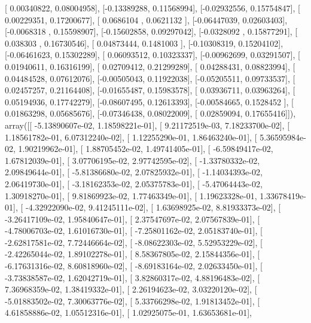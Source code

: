 \documentclass{article}
\begin{document}
       [ 0.00340822,  0.08004958],
       [-0.13389288,  0.11568994],
       [-0.02932556,  0.15754847],
       [ 0.00229351,  0.17200677],
       [ 0.0686104 ,  0.0621132 ],
       [-0.06447039,  0.02603403],
       [-0.0068318 ,  0.15598907],
       [-0.15602858,  0.09297042],
       [-0.0328092 ,  0.15877291],
       [ 0.038303  ,  0.16730546],
       [ 0.04873444,  0.1481003 ],
       [-0.10308319,  0.15204102],
       [-0.06461623,  0.15302289],
       [ 0.06093512,  0.10323337],
       [-0.00962699,  0.03291507],
       [ 0.01940611,  0.16316199],
       [ 0.02709412,  0.21299289],
       [ 0.04288431,  0.08823994],
       [ 0.04484528,  0.07612076],
       [-0.00505043,  0.11922038],
       [-0.05205511,  0.09733537],
       [ 0.02457257,  0.21164408],
       [-0.01655487,  0.15983578],
       [ 0.03936711,  0.03963264],
       [ 0.05194936,  0.17742279],
       [-0.08607495,  0.12613393],
       [-0.00584665,  0.1528452 ],
       [ 0.01863298,  0.05685676],
       [-0.07346438,  0.08022009],
       [ 0.02859094,  0.17655416]]), array([[ -5.13890607e-02,   1.18598221e-01],
       [  9.21172519e-03,   7.18233700e-02],
       [  1.18561782e-01,   6.07312240e-02],
       [  1.12255290e-01,   1.86463240e-01],
       [  5.36595984e-02,   1.90219962e-01],
       [  1.88705452e-02,   1.49741405e-01],
       [ -6.59849417e-02,   1.67812039e-01],
       [  3.07706195e-02,   2.97742595e-02],
       [ -1.33780332e-02,   2.09849644e-01],
       [ -5.81386680e-02,   2.07825932e-01],
       [ -1.14034393e-02,   2.06419730e-01],
       [ -3.18162353e-02,   2.05375783e-01],
       [ -5.47064443e-02,   1.30918270e-01],
       [  9.81869923e-02,   1.77463349e-01],
       [  1.19623328e-01,   1.33678419e-01],
       [ -4.32922090e-02,   9.41245111e-02],
       [  1.63698925e-02,   8.81933373e-02],
       [ -3.26417109e-02,   1.95840647e-01],
       [  2.37547697e-02,   2.07567839e-01],
       [ -4.78006703e-02,   1.61016730e-01],
       [ -7.25801162e-02,   2.05183740e-01],
       [ -2.62817581e-02,   7.72446664e-02],
       [ -8.08622303e-02,   5.52953229e-02],
       [ -2.42265044e-02,   1.89102278e-01],
       [  8.58367805e-02,   2.15844356e-01],
       [ -6.17631316e-02,   8.60818960e-02],
       [ -8.69183164e-02,   2.02633450e-01],
       [ -3.73838587e-02,   1.62042719e-01],
       [  3.82860317e-02,   4.88196483e-02],
       [  7.36968359e-02,   1.38419332e-01],
       [  2.26194623e-02,   3.03220120e-02],
       [ -5.01883502e-02,   7.30063776e-02],
       [  5.33766298e-02,   1.91813452e-01],
       [  4.61858886e-02,   1.05512316e-01],
       [  1.02925075e-01,   1.63653681e-01],
\end{document}
